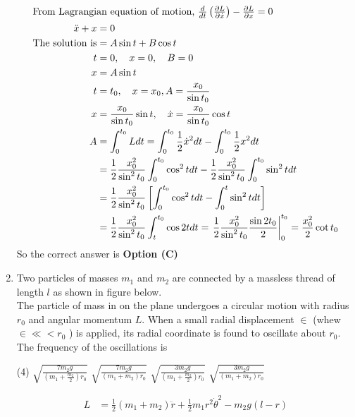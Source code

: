 \begin{enumerate}
\begin{answer}
\begin{align*}
	\intertext{From Lagrangian equation of motion, $\frac{d}{d t}\left(\frac{\partial L}{\partial \dot{x}}\right)-\frac{\partial L}{\partial x}=0$}
	\ddot{x}+x&=0\\
	\text{The solution is}&=A \sin t+B \cos t\\
	t&=0, \quad x=0, \quad B=0\\
	x&=A \sin t\\
	t&=t_{0}, \quad x=x_{0}, A=\frac{x_{0}}{\sin t_{0}}\\
	x&=\frac{x_{0}}{\sin t_{0}} \sin t, \quad \dot{x}=\frac{x_{0}}{\sin t_{0}} \cos t\\
	A&=\int_{0}^{t_{0}} L d t=\int_{0}^{t_{0}} \frac{1}{2} \dot{x}^{2} d t-\int_{0}^{t_{0}} \frac{1}{2} x^{2} d t\\&=\frac{1}{2} \frac{x_{0}^{2}}{\sin ^{2} t_{0}} \int_{0}^{t_{0}} \cos ^{2} t d t-\frac{1}{2} \frac{x_{0}^{2}}{\sin ^{2} t_{0}} \int_{0}^{t_{0}} \sin ^{2} t d t\\
	&=\frac{1}{2} \frac{x_{0}^{2}}{\sin ^{2} t_{0}}\left[\int_{0}^{t_{0}} \cos ^{2} t d t-\int_{0}^{t} \sin ^{2} t d t\right]\\&=\frac{1}{2} \frac{x_{0}^{2}}{\sin ^{2} t_{0}} \int_{t}^{t_{0}} \cos 2 t d t=\left.\frac{1}{2} \frac{x_{0}^{2}}{\sin ^{2} t_{0}} \frac{\sin 2 t_{0}}{2}\right|_{0} ^{t_{0}}=\frac{x_{0}^{2}}{2} \cot t_{0}
	\end{align*}
	So the correct answer is \textbf{Option (C)}
\end{answer}
	\item Two particles of masses $m_{1}$ and $m_{2}$ are connected by a massless thread of length $l$ as shown in figure below.\\
	The particle of mass in on the plane undergoes a circular motion with radius $r_{0}$ and angular momentum $L$. When a small radial displacement $\in$ (whew $\in \ll<r_{0}$ ) is applied, its radial coordinate is found to oscillate about $r_{0}$. The frequency of the oscillations is
	{}
	\begin{tasks}(4)
		\task[\textbf{A.}] $\sqrt{\frac{7 m_{2} g}{\left(m_{1}+\frac{m_{2}}{2}\right) r_{0}}}$
		\task[\textbf{B.}] $\sqrt{\frac{7 m_{2} g}{\left(m_{1}+m_{2}\right) r_{0}}}$
		\task[\textbf{C.}] $\sqrt{\frac{3 m_{2} g}{\left(m_{1}+\frac{m_{2}}{2}\right) r_{0}}}$
		\task[\textbf{D.}] $\sqrt{\frac{3 m_{2} g}{\left(m_{1}+m_{2}\right) r_{0}}}$
	\end{tasks}
\begin{answer}
	\begin{align*}
	L&=\frac{1}{2}\left(m_{1}+m_{2}\right) \ddot{r}+\frac{1}{2} m_{1} r^{2} \dot{\theta}^{2}-m_{2} g(l-r)\\

\end{align*}
\end{answer}
\end{enumerate}
